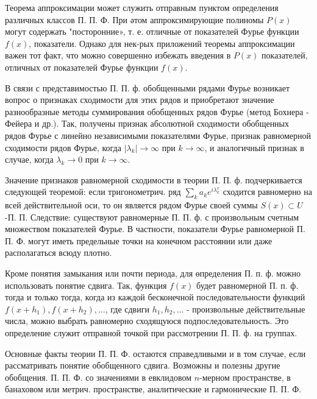 \documentclass[10pt]{article}
\begin{document}
Теорема аппроксимации может служить отправным пунктом определения различных классов П. П. Ф. При әтом аппроксимирующие полиномы $P(x)$ могут содержать "посторонние», т. е. отличные от показателей Фурье функции $f(x)$, показатели. Однако для нек-рых приложений теоремы аппроксимации важен тот факт, что можно совершенно избежать введения в $P(x)$ показателей, отличных от показателей Фурье функции $f(x)$.



В связи с представимостью П. П. ф. обобщенными рядами Фурье возникает вопрос о признаках сходимости для этих рядов и приобретают значение разнообразные методы суммирования обобщенных рядов Фурье (метод Бохнера - Фейера и др.). Так, получены признак абсолютной сходимости обобщенных рядов Фурье с линейно независимыми показателями Фурье, признак равномерной сходимости рядов Фурье, когда $\left|\lambda_{k}\right| \rightarrow \infty$ при $k \rightarrow \infty$, и аналогичный признак в случае, когда $\lambda_{k} \rightarrow 0$ при $k \rightarrow \infty$.



Значение признаков равномерной сходимости в теории П. П. ф. подчеркивается следующей теоремой: если тригонометрич. ряд $\sum_{k} a_{k} e^{i \lambda_{k}^{x}}$ сходится равномерно на всей действительной оси, то он является рядом Фурье своей суммы $S(x) \subset U$-П. П. Следствие: существуют равномерные П. П. ф. с произвольным счетным множеством показателей Фурье. В частности, показатели Фурье равномерной П. П. Ф. могут иметь предельные точки на конечном расстоянии или даже располагаться всюду плотно.



Кроме понятия замыкания или почти периода, для өпределения П. п. ф. можно использовать понятие сдвига. Так, функция $f(x)$ будет равномерной П. п. ф. тогда и только тогда, когда из каждой бесконечной последовательности функций $f\left(x+h_{1}\right), f\left(x+h_{2}\right), \ldots$, где сдвиги $h_{1}, h_{2}, \ldots$ - произвольные действительные числа, можно выбрать равномерно сходящуюся подпоследовательность. Это определение служит отправной точкой при рассмотрении П. П. ф. на группах.



Основные факты теории П. П. Ф. остаются справедливыми и в том случае, если рассматривать понятие обобщенного сдвига. Возможны и полезны другие обобщения. П. П. Ф. со значениями в евклидовом $n$-мерном пространстве, в банаховом или метрич. пространстве, аналитические и гармонические П. П. Ф.
\end{document}
